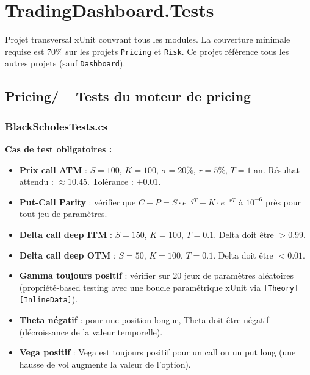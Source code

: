 \documentclass[a4paper,11pt]{article}
\newcommand{\cs}[1]{\texttt{\color{codeinline}#1}}
\begin{document}
\newpage

\section{TradingDashboard.Tests}

\begin{tcolorbox}[note]
Projet transversal xUnit couvrant tous les modules. La couverture minimale
requise est 70\% sur les projets \texttt{Pricing} et \texttt{Risk}. Ce projet
référence tous les autres projets (sauf \texttt{Dashboard}).
\end{tcolorbox}

\subsection{Pricing/ -- Tests du moteur de pricing}

\subsubsection{BlackScholesTests.cs}

\textbf{Cas de test obligatoires :}
\begin{itemize}
  \item \textbf{Prix call ATM} : $S=100$, $K=100$, $\sigma=20\%$, $r=5\%$,
        $T=1$ an. Résultat attendu : $\approx 10.45$. Tolérance : $\pm 0.01$.
  \item \textbf{Put-Call Parity} : vérifier que
        $C - P = S \cdot e^{-qT} - K \cdot e^{-rT}$ à $10^{-6}$ près
        pour tout jeu de paramètres.
  \item \textbf{Delta call deep ITM} : $S=150$, $K=100$, $T=0.1$. Delta doit
        être $> 0.99$.
  \item \textbf{Delta call deep OTM} : $S=50$, $K=100$, $T=0.1$. Delta doit
        être $< 0.01$.
  \item \textbf{Gamma toujours positif} : vérifier sur 20 jeux de paramètres
        aléatoires (propriété-based testing avec une boucle paramétrique
        xUnit via \cs{[Theory][InlineData]}).
  \item \textbf{Theta négatif} : pour une position longue, Theta doit être
        négatif (décroissance de la valeur temporelle).
  \item \textbf{Vega positif} : Vega est toujours positif pour un call ou un put
        long (une hausse de vol augmente la valeur de l'option).
\end{itemize}
\end{document}
